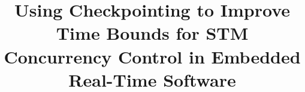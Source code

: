 \documentclass[conference]{IEEEtran}
\begin{document}
%
\title{\huge{Using Checkpointing to Improve Time Bounds for STM Concurrency Control in Embedded Real-Time Software}}


\begin{comment}
\author{\IEEEauthorblockN{Mohammed Elshambakey}
\IEEEauthorblockA{ECE, VT\\
Blacksburg, VA 24060\\
Email: shambake@vt.edu}
\and
\IEEEauthorblockN{Binoy Ravindran}
\IEEEauthorblockA{ECE, VT\\
Blacksburg, VA 24060\\
Email: binoy@vt.edu}
}
\end{comment}

\author{\IEEEauthorblockN{}
\IEEEauthorblockA{}
}

% 








\maketitle
\end{document}
